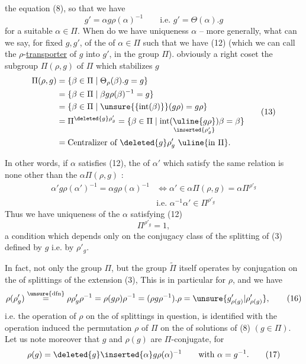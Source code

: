 the equation (8), so that we have
\[
g'=\alpha g\rho(\alpha)^{-1}\qquad\text{i.e. }g'=\Theta(\alpha).g \tag{12}
\]
for a suitable $\alpha\in\Pi$. When do we have uniqueness  $\alpha$ -- more generally, what can we say, for fixed $g,g'$, of the  of $\alpha\in\Pi$  such that we have (12) (which we can call the $\rho$-\uline{transporter} of $g$ into $g'$, in the group $\Pi$).  obviously a right coset  the subgroup $\Pi(\rho,g)$ of $\Pi$ which  stabilizes $g$
\[
\begin{aligned}
\Pi(\rho,g)&=\{\beta\in\Pi\mid\Theta_\rho(\beta).g=g\}\\
&=\{\beta\in\Pi\mid\beta g\rho(\beta)^{-1}=g\}\\
&=\{\beta\in\Pi\mid\unsure{\{\mathrm{int}(\beta)\}}(g\rho)=g\rho\}\\
&=\Pi^{\deleted{g}\rho'_g}=\{\beta\in\Pi\mid\mathrm{int}(\underset{\inserted{\rho'_g}}{\uline{g\rho}})\beta=\beta\}\\
&=\text{Centralizer of }\deleted{g}\rho'_g\ \uline{\text{in }\Pi}.
\end{aligned}\tag{13}
\]

In other words, if $\alpha$ satisfies (12), the  of $\alpha'$ which satisfy the same relation is none other than the  $\alpha\Pi(\rho,g)$ :
\[
\begin{aligned}
\alpha'g\rho(\alpha')^{-1}=\alpha g\rho(\alpha)^{-1}
&\Longleftrightarrow\alpha'\in\alpha\Pi(\rho,g)=\alpha\Pi^{\rho'_g}\\
&\text{i.e. }\alpha^{-1}\alpha'\in\Pi^{\rho'_g}
\end{aligned}\tag{14}
\]
Thus we have uniqueness of the $\alpha$ satisfying (12)  
\[
\Pi^{\rho'_g}=1, \tag{15}
\]
a condition which depends only on the conjugacy class of the splitting  of (3) defined by $g$ i.e. by $\rho'_g$.


In fact, not only the group $\Pi$, but the group $\widetilde\Pi$ itself operates by conjugation on the  of splittings of the extension (3), This is in particular  for $\rho$, and we have
\[
\rho(\rho'_g)\overset{\unsure{\mathrm{dfn}}}{=}
\rho\rho'_g\rho^{-1}=\rho(g\rho)\rho^{-1}
=(\rho g\rho^{-1}).\rho=\unsure{g'_{\rho(g)}|\rho'_{\rho(g)}}, \tag{16}
\]
i.e. the operation of $\rho$ on the  of splittings in question, is identified with the operation  induced  the permutation $\rho$ of $\Pi$ on the  of solutions of (8) $(g\in\Pi)$. Let us note moreover that $g$ and $\rho(g)$  are $\Pi$-conjugate, for
\[
\rho(g)=\deleted{g}\inserted{\alpha}g\rho(\alpha)^{-1}\qquad\text{with }\alpha=g^{-1}. \tag{17}
\]


